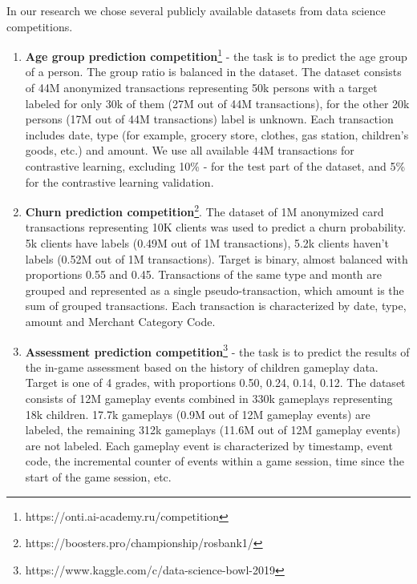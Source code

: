 \documentclass[sigconf]{acmart}
\begin{document}
In our research we chose several publicly available datasets from data science competitions.
\begin{enumerate}
    \item \textbf{Age group prediction competition}\footnote{https://onti.ai-academy.ru/competition} - the task is to predict the age group of a person. The group ratio is balanced in the dataset. The dataset consists of 44M anonymized transactions representing 50k persons with a target labeled for only 30k of them (27M out of 44M transactions), for the other 20k persons (17M out of 44M transactions) label is unknown. Each transaction includes date, type (for example, grocery store, clothes, gas station, children's goods, etc.) and amount. We use all available 44M transactions for contrastive learning, excluding 10\% - for the test part of the dataset, and  5\% for the contrastive learning validation.
        
    
    \item \textbf{Churn prediction competition}\footnote{https://boosters.pro/championship/rosbank1/}. The dataset of 1M anonymized card transactions representing 10K clients was used to predict a churn probability. 5k clients have labels (0.49M out of 1M transactions), 5.2k clients haven't labels (0.52M out of 1M transactions). Target is binary, almost balanced with proportions 0.55 and 0.45. Transactions of the same type and month are grouped and represented as a single pseudo-transaction, which amount is the sum of grouped transactions. Each transaction is characterized by date, type, amount and Merchant Category Code.
    
    \item \textbf{Assessment prediction competition}\footnote{https://www.kaggle.com/c/data-science-bowl-2019} - the task is to predict the results of the in-game assessment based on the history of children gameplay data. Target is one of 4 grades, with proportions 0.50, 0.24, 0.14, 0.12. The dataset consists of 12M gameplay events combined in 330k gameplays representing 18k children. 17.7k gameplays (0.9M out of 12M gameplay events) are labeled, the remaining 312k gameplays (11.6M out of 12M gameplay events) are not labeled. Each gameplay event is characterized by timestamp, event code, the incremental counter of events within a game session, time since the start of the game session, etc.
    

\end{enumerate}
\end{document}
